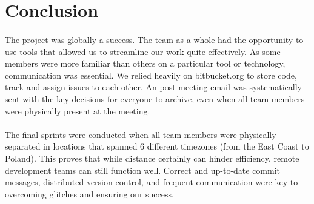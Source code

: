 \section{Conclusion}
\paragraph{}
The project was globally a success. The team as a whole had the opportunity to use tools that allowed us to streamline our work quite effectively. As some members were more familiar than others on a particular tool or technology, communication was essential. We relied heavily on bitbucket.org to store code, track and assign issues to each other. An post-meeting email was systematically sent with the key decisions for everyone to archive, even when all team members were physically present at the meeting.

\paragraph{}
The final sprints were conducted when all team members were physically separated in locations that spanned 6 different timezones (from the East Coast to Poland). This proves that while distance certainly can hinder efficiency, remote development teams can still function well. Correct and up-to-date commit messages, distributed version control, and frequent communication were key to overcoming glitches and ensuring our success.

